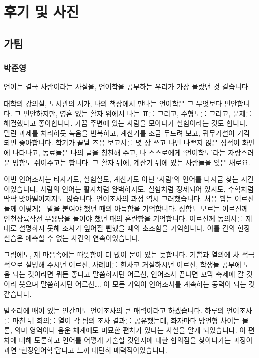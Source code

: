 \chapter{후기 및 사진}

\section{가팀}

\subsection{박준영}
언어는 결국 사람이라는 사실을, 언어학을 공부하는 우리가 가장 몰랐던 것 같습니다.

대학의 강의실, 도서관의 서가, 나의 책상에서 만나는 언어학은 그 무엇보다 편안합니다. 그 편안하지만, 영혼 없는 활자 위에서 나는 표를 그리고, 수형도를 그리고, 문제를 해결했다고 좋아합니다. 가끔 주변에 있는 사람을 모아다가 실험이라는 것도 합니다. 밀린 과제를 처리하듯 녹음을 반복하고, 계산기를 조금 두드려 보고, 귀무가설이 기각되면 좋아합니다. 학기가 끝날 즈음 보고서를 몇 장 쓰고 나면 나쁘지 않은 성적이 화면에 나타나고, 동료들은 나의 글을 칭찬해 주고, 나 스스로에게 ‘언어학도’라는 자랑스러운 명함도 쥐어주고는 합니다. 그 활자 뒤에, 계산기 뒤에 있는 사람들을 잊은 채로요.

이번 언어조사는 타자기도, 실험실도, 계산기도 아닌 ‘사람’의 언어를 다시금 찾는 시간이었습니다. 사람의 언어는 활자처럼 완벽하지도, 실험처럼 정제되어 있지도, 수학처럼 딱딱 맞아떨어지지도 않습니다. 언어조사의 과정 역시 그러했습니다. 처음 뵙는 어르신들께 어떻게든 말을 붙여야 했던 때의 아득함을 기억합니다. 성함도 모르는 어르신께 인천상륙작전 무용담을 들어야 했던 때의 혼란함을 기억합니다. 어르신께 동의서를 제대로 설명하지 못해 조사가 엎어질 뻔했을 때의 초조함을 기억합니다. 이틀 간의 현장실습은 예측할 수 없는 사건의 연속이었습니다.

그럼에도, 제 마음속에는 따뜻함이 더 많이 묻어 있는 듯합니다. 기쁨과 열의에 차 적극적으로 설명해 주시던 어르신, 사례비를 한사코 거절하시던 어르신, 학생들 공부에 도움 되는 것이라면 뭐든 좋다고 말씀하시던 어르신, 언어조사 끝나면 꼬막 축제에 갈 것이라 웃으며 말씀하시던 어르신…. 이 모든 기억이 언어조사를 계속하는 동력이 되는 것 같습니다.

말소리에 배어 있는 인간미도 언어조사의 큰 매력이라고 하겠습니다. 하루의 언어조사를 마친 뒤 회의를 열어 각 팀의 조사 결과를 공유했는데, 화자마다 방언형 차이는 물론, 의미 영역이나 음운 체계에도 미묘한 편차가 있다는 사실을 알게 되었습니다. 이 편차에 대해 토론하고 언어를 어떻게 기술할 것인지에 대한 합의점을 찾아나가는 과정이 과연 ‘현장언어학’답다고 느껴 대단히 매력적이었습니다.

